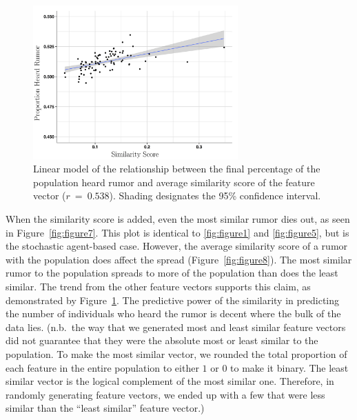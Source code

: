 \begin{figure}[H]
\captionsetup{width=0.8\textwidth}
\centering
    \includegraphics[width=0.7\textwidth]{figures/figure9}
  \caption{ Linear model of the relationship between the final percentage of the population heard rumor and average similarity score of the feature vector ($ r~=~0.538 $).
Shading designates the 95\% confidence interval.}
\label{fig:figure9}
\end{figure}

When the similarity score is added, even the most similar rumor dies out, as seen in Figure~\ref{fig:figure7}.
This plot is identical to \ref{fig:figure1} and \ref{fig:figure5}, but is the stochastic agent-based case.
However, the average similarity score of a rumor with the population does affect the spread (Figure~\ref{fig:figure8}).
The most similar rumor to the population spreads to more of the population than does the least similar.
The trend from the other feature vectors supports this claim, as demonstrated by Figure~\ref{fig:figure9}.
The predictive power of the similarity in predicting the number of individuals who heard the rumor is decent where the bulk of the data lies.
(n.b.\ the way that we generated most and least similar feature vectors did not guarantee that they were the absolute most or least similar to the population.
To make the most similar vector, we rounded the total proportion of each feature in the entire population to either $ 1 $ or $ 0 $ to make it binary.
The least similar vector is the logical complement of the most similar one.
Therefore, in randomly generating feature vectors, we ended up with a few that were less similar than the ``least similar'' feature vector.)
